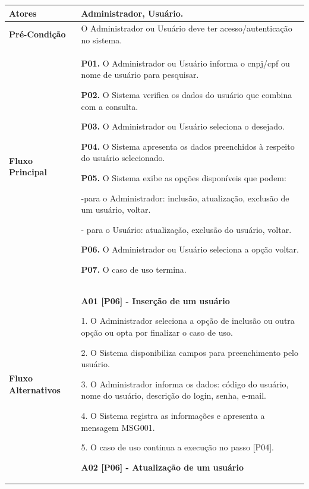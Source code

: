 \begin{quadro}[!htbp]
	\begin{tabular}{  m{4cm}  m{11cm} }
        \cellcolor{gray!10} \textbf {Atores}                & \cellcolor{gray!10} Administrador, Usuário.  \\ \hline
        \textbf {Pré-Condição}          & O Administrador ou Usuário deve ter acesso/autenticação no sistema.  \\ \hline
       
        \cellcolor{gray!10} \textbf {Fluxo Principal}       & \cellcolor{gray!10} \textbf {P01.} O Administrador ou Usuário informa o cnpj/cpf ou nome de usuário para pesquisar.
        
        \textbf {P02.} O Sistema verifica os dados do usuário que combina com a consulta.
        
        \textbf {P03.} O Administrador ou Usuário seleciona o desejado.
        
        \textbf {P04.} O Sistema apresenta os dados preenchidos à respeito do usuário selecionado.
        
        \textbf {P05.} O Sistema exibe as opções disponíveis que podem:
        
        -para o Administrador: inclusão, atualização, exclusão de um usuário, voltar.
        
        - para o Usuário: atualização, exclusão do usuário, voltar.
        
        \textbf {P06.} O Administrador ou Usuário seleciona a opção voltar.
        
        \textbf {P07.} O caso de uso termina. \\ \hline
	
        \textbf {Fluxo  Alternativos}  & \textbf {A01 [P06] - Inserção de um usuário}
        
        1. O Administrador seleciona a opção de inclusão ou outra opção ou opta por finalizar o caso de uso.
        
        2. O Sistema disponibiliza campos para preenchimento pelo usuário.
        
        3. O Administrador informa os dados: código do usuário, nome do usuário, descrição do login, senha, e-mail.
        
        4. O Sistema registra as informações e apresenta a mensagem MSG001.
        
        5. O caso de uso continua a execução no passo [P04].
        
        \textbf {A02 [P06] - Atualização de um usuário}
        

\end{tabular}
\end{quadro}
